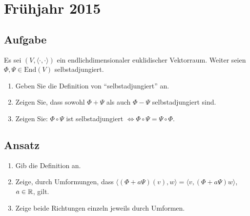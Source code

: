 \section{Frühjahr 2015}

\subsection{Aufgabe}
Es sei \( (V,\langle \cdot,\cdot \rangle) \) ein endlichdimensionaler euklidischer Vektorraum. Weiter seien \( \Phi,\Psi \in \text{End}(V) \) selbstadjungiert.
\begin{enumerate}
	\item Geben Sie die Definition von ``selbstadjungiert'' an.
	\item Zeigen Sie, dass sowohl \( \Phi + \Psi \) als auch \( \Phi - \Psi \) selbstadjungiert sind.
	\item Zeigen Sie: \( \Phi \circ \Psi \) ist selbstadjungiert \( \Leftrightarrow \Phi \circ \Psi = \Psi \circ \Phi \).
\end{enumerate}

\subsection{Ansatz}
\begin{enumerate}
	\item Gib die Definition an. 
	\item Zeige, durch Umformungen, dass \( \langle (\Phi + a\Psi)(v),w \rangle = \langle v,(\Phi + a\Psi)w \rangle \), \( a \in \mathbb{R} \), gilt.
	\item Zeige beide Richtungen einzeln jeweils durch Umformen.
\end{enumerate}


